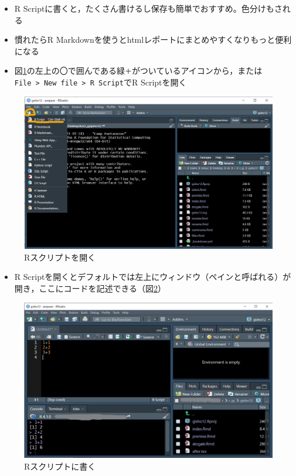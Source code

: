 \documentclass[
  xelatex,ja=standard, b5paper]{bxjsbook}
\providecommand{\tightlist}{%
  \setlength{\itemsep}{0pt}\setlength{\parskip}{0pt}}
\begin{document}
\begin{itemize}
\tightlist
\item
  R Scriptに書くと，たくさん書けるし保存も簡単でおすすめ。色分けもされる
\item
  慣れたらR Markdownを使うとhtmlレポートにまとめやすくなりもっと便利になる
\item
  図\ref{fig:script}の左上の〇で囲んである緑\texttt{＋}がついているアイコンから，または\texttt{File\ \textgreater{}\ New\ file\ \textgreater{}\ R\ Script}でR Scriptを開く
\end{itemize}

\begin{figure}

{\centering \includegraphics[width=0.7\linewidth]{images/newfile} 

}

\caption{Rスクリプトを開く}\label{fig:script}
\end{figure}

\begin{itemize}
\tightlist
\item
  R Scriptを開くとデフォルトでは左上にウィンドウ（ペインと呼ばれる）が開き，ここにコードを記述できる（図\ref{fig:script2}）
\end{itemize}

\begin{figure}

{\centering \includegraphics[width=0.7\linewidth]{images/rscript} 

}

\caption{Rスクリプトに書く}\label{fig:script2}
\end{figure}
\end{document}

